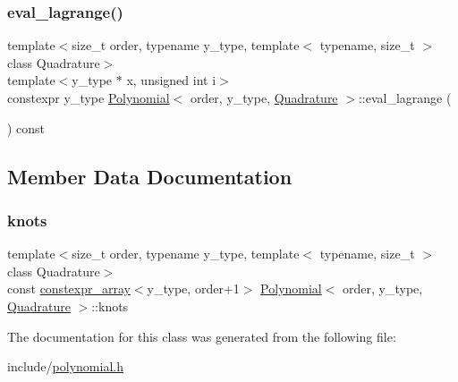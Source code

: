 \subsubsection{\texorpdfstring{eval\+\_\+lagrange()}{eval\_lagrange()}}
{\footnotesize\ttfamily template$<$size\+\_\+t order, typename y\+\_\+type, template$<$ typename, size\+\_\+t $>$ class Quadrature$>$ \\
template$<$y\+\_\+type $\ast$ x, unsigned int i$>$ \\
constexpr y\+\_\+type \hyperlink{class_polynomial}{Polynomial}$<$ order, y\+\_\+type, \hyperlink{class_quadrature}{Quadrature} $>$\+::eval\+\_\+lagrange (\begin{DoxyParamCaption}{ }\end{DoxyParamCaption}) const\hspace{0.3cm}{\ttfamily [inline]}}



\subsection{Member Data Documentation}
\mbox{\label{class_polynomial_a4319b08af5d88c22598210920ef74d7d}} 
\subsubsection{\texorpdfstring{knots}{knots}}
{\footnotesize\ttfamily template$<$size\+\_\+t order, typename y\+\_\+type, template$<$ typename, size\+\_\+t $>$ class Quadrature$>$ \\
const \hyperlink{classconstexpr__array}{constexpr\+\_\+array}$<$y\+\_\+type, order+1$>$ \hyperlink{class_polynomial}{Polynomial}$<$ order, y\+\_\+type, \hyperlink{class_quadrature}{Quadrature} $>$\+::knots}



The documentation for this class was generated from the following file\+:\begin{DoxyCompactItemize}
\item 
include/\hyperlink{polynomial_8h}{polynomial.\+h}\end{DoxyCompactItemize}
